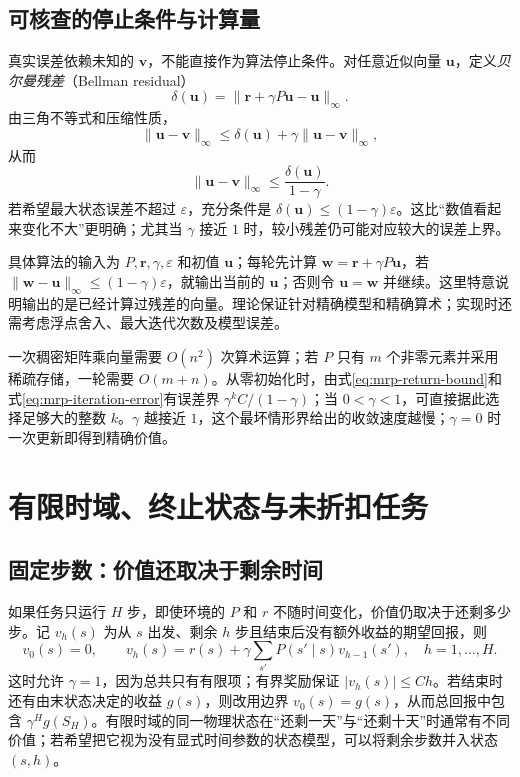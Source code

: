 \documentclass[UTF8,12pt,a4paper,fontset=fandol]{ctexart}
\begin{document}
\subsection{可核查的停止条件与计算量}

真实误差依赖未知的 $\boldsymbol v$，不能直接作为算法停止条件。对任意近似向量 $\boldsymbol u$，定义\emph{贝尔曼残差}（Bellman residual）
\[
  \delta(\boldsymbol u)=\|\boldsymbol r+\gamma P\boldsymbol u-\boldsymbol u\|_\infty.
\]
由三角不等式和压缩性质，
\[
  \|\boldsymbol u-\boldsymbol v\|_\infty
  \leq\delta(\boldsymbol u)+\gamma\|\boldsymbol u-\boldsymbol v\|_\infty,
\]
从而
\begin{equation}
  \|\boldsymbol u-\boldsymbol v\|_\infty
  \leq\frac{\delta(\boldsymbol u)}{1-\gamma}.
  \label{eq:mrp-residual-bound}
\end{equation}
若希望最大状态误差不超过 $\varepsilon$，充分条件是 $\delta(\boldsymbol u)\leq(1-\gamma)\varepsilon$。这比“数值看起来变化不大”更明确；尤其当 $\gamma$ 接近 $1$ 时，较小残差仍可能对应较大的误差上界。

具体算法的输入为 $P,\boldsymbol r,\gamma,\varepsilon$ 和初值 $\boldsymbol u$；每轮先计算 $\boldsymbol w=\boldsymbol r+\gamma P\boldsymbol u$，若 $\|\boldsymbol w-\boldsymbol u\|_\infty\leq(1-\gamma)\varepsilon$，就输出当前的 $\boldsymbol u$；否则令 $\boldsymbol u=\boldsymbol w$ 并继续。这里特意说明输出的是已经计算过残差的向量。理论保证针对精确模型和精确算术；实现时还需考虑浮点舍入、最大迭代次数及模型误差。

一次稠密矩阵乘向量需要 $O(n^2)$ 次算术运算；若 $P$ 只有 $m$ 个非零元素并采用稀疏存储，一轮需要 $O(m+n)$。从零初始化时，由式\eqref{eq:mrp-return-bound}和式\eqref{eq:mrp-iteration-error}有误差界 $\gamma^kC/(1-\gamma)$；当 $0<\gamma<1$，可直接据此选择足够大的整数 $k$。$\gamma$ 越接近 $1$，这个最坏情形界给出的收敛速度越慢；$\gamma=0$ 时一次更新即得到精确价值。

\section{有限时域、终止状态与未折扣任务}
\label{sec:mrp-undiscounted}

\subsection{固定步数：价值还取决于剩余时间}

如果任务只运行 $H$ 步，即使环境的 $P$ 和 $r$ 不随时间变化，价值仍取决于还剩多少步。记 $v_h(s)$ 为从 $s$ 出发、剩余 $h$ 步且结束后没有额外收益的期望回报，则
\begin{equation}
  v_0(s)=0,\qquad
  v_h(s)=r(s)+\gamma\sum_{s'}P(s'\mid s)v_{h-1}(s'),
  \quad h=1,\ldots,H.
  \label{eq:mrp-finite-horizon}
\end{equation}
这时允许 $\gamma=1$，因为总共只有有限项；有界奖励保证 $|v_h(s)|\leq Ch$。若结束时还有由末状态决定的收益 $g(s)$，则改用边界 $v_0(s)=g(s)$，从而总回报中包含 $\gamma^Hg(S_H)$。有限时域的同一物理状态在“还剩一天”与“还剩十天”时通常有不同价值；若希望把它视为没有显式时间参数的状态模型，可以将剩余步数并入状态 $(s,h)$。
\end{document}
